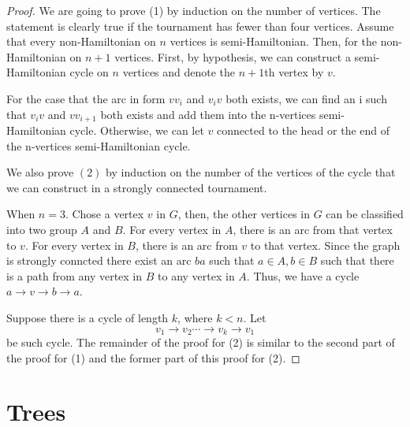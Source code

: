 \documentclass[a4paper,11pt]{article}%
\theoremstyle{remark}
\theoremstyle{definition}
\theoremstyle{definition}
\theoremstyle{definition}
\theoremstyle{definition}
\theoremstyle{plain}
\theoremstyle{definition}
\begin{document}
\begin{proof}
    We are going to prove (1) by induction on the number of vertices.
    The statement is clearly true if the tournament has fewer than four vertices.
    Assume that every non-Hamiltonian on $n$ vertices is semi-Hamiltonian.
    Then, for the non-Hamiltonian on $n+1$ vertices. First, by hypothesis,
    we can construct a semi-Hamiltonian cycle on $n$ vertices and 
    denote the $n+1$th vertex by $v$.

    For the case that the arc in form $vv_i$ and $v_iv$ both exists, 
    we can find an i such that $v_iv$ and $vv_{i+1}$ both exists and 
    add them into the n-vertices semi-Hamiltonian cycle.
    Otherwise, we can let $v$ connected to the 
    head or the end of the n-vertices semi-Hamiltonian cycle. 

    We also prove $(2)$ by induction on the number of the vertices of 
    the cycle that we can construct in a strongly connected tournament.

    When $n=3$. Chose a vertex $v$ in $G$, then, the other vertices in $G$
    can be classified into two group $A$ and $B$. For every vertex in $A$,
    there is an arc from that vertex to $v$. For every vertex in $B$, 
    there is an arc from $v$ to that vertex.
    Since the graph is strongly conncted there exist an arc $ba$ such that 
    $a\in A,b\in B$ such that there is a path from any vertex in  $B$ to 
    any vertex in $A$. Thus, we have a cycle $a\rightarrow v \rightarrow b\rightarrow a$.

    Suppose there is a cycle of length $k$, where $k<n$.
    Let  
    \[v_1\rightarrow v_2\cdots\rightarrow v_k\rightarrow v_1\]
    be such cycle.
    The remainder of the proof for (2) is similar to the second part of the 
    proof for (1) and the former part of this proof for (2).
\end{proof}
\section{Trees}
\end{document}

